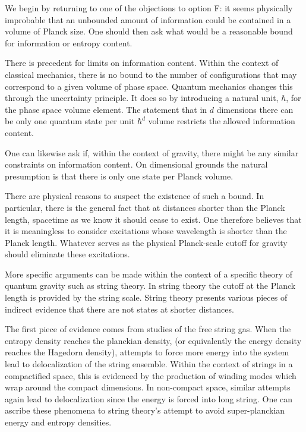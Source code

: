 
We begin by returning to one of the objections to option F:
it seems physically improbable that
an unbounded amount of information could be
contained in a volume of Planck size.  One should then ask what would be
a reasonable bound for information or entropy content.

There is precedent for limits on information content.
Within the context of classical mechanics, there is no bound to the
number of configurations that may correspond to a given volume of phase
space.  Quantum mechanics changes this through the uncertainty
principle.  It does so
by introducing
a  natural unit,
$\hbar$,
for the phase space volume element.
The statement that in $d$ dimensions there  can be only
one quantum state per unit $\hbar^d$ volume  restricts the
allowed information content.

One can likewise ask if, within the context of gravity, there might
be any similar constraints on information content.
On dimensional grounds the natural presumption is that there is
only one state per Planck volume.

There are physical reasons to suspect the existence
of such a bound.  In particular, there
is the general fact that at distances shorter
than the Planck length, spacetime as we know it should cease to exist.
One therefore believes that it is meaningless to consider excitations
whose wavelength is shorter than the Planck length.  Whatever serves
as the physical Planck-scale cutoff for gravity should eliminate
these excitations.

More specific arguments can be made within the context of a specific
theory of quantum gravity such as string theory.  In string theory
the cutoff at the Planck length is provided by the string scale.
String theory presents
various pieces of indirect evidence  that
there are not states at shorter distances.

The first piece of evidence comes from studies of the free string
gas.  When the entropy density reaches the planckian density, (or
equivalently the energy density reaches the Hagedorn density),
attempts to force more energy into the system lead to delocalization
of the string ensemble.  Within the context of strings in a
compactified space, this is evidenced by the production of winding
modes which wrap around the compact
dimensions.  In non-compact space, similar attempts again lead to
delocalization since the energy is forced into long
string.  One can
ascribe these phenomena to string theory's attempt to avoid
super-planckian energy
and entropy densities.


